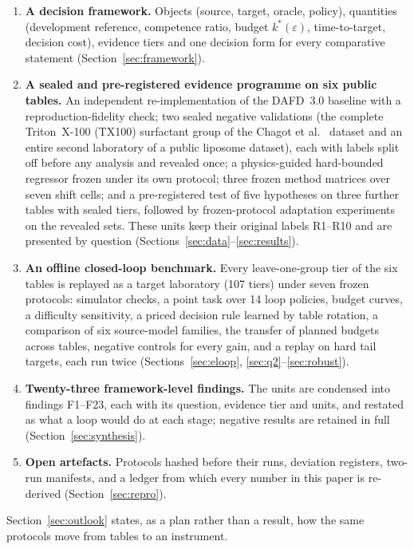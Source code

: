 \documentclass[11pt,a4paper]{article}
\newcommand{\tox}{TX100}
\begin{document}
\begin{enumerate}[leftmargin=*,itemsep=2pt]
\item \textbf{A decision framework.} Objects (source, target, oracle,
  policy), quantities (development reference, competence ratio, budget
  $k^{*}(\varepsilon)$, time-to-target, decision cost), evidence tiers and one
  decision form for every comparative statement (Section~\ref{sec:framework}).
\item \textbf{A sealed and pre-registered evidence programme on six public
  tables.} An independent re-implementation of the DAFD~3.0 baseline with a
  reproduction-fidelity check; two sealed negative validations (the complete
  Triton~X-100 (\tox{}) surfactant group of the Chagot et
  al.~\cite{chagot2022} dataset and an entire second laboratory of a public
  liposome dataset), each with labels split off before any analysis and
  revealed once; a physics-guided hard-bounded regressor frozen under its own
  protocol; three frozen method matrices over seven shift cells; and a
  pre-registered test of five hypotheses on three further tables with sealed
  tiers, followed by frozen-protocol adaptation experiments on the revealed
  sets. These units keep their original labels R1--R10 and are presented by
  question (Sections~\ref{sec:data}--\ref{sec:results}).
\item \textbf{An offline closed-loop benchmark.} Every leave-one-group tier of
  the six tables is replayed as a target laboratory (107 tiers) under seven
  frozen protocols: simulator checks, a point task over 14 loop policies, budget
  curves, a difficulty sensitivity, a priced decision rule learned by table
  rotation, a comparison of six source-model families, the transfer of planned
  budgets across tables, negative controls for every gain, and a replay on hard
  tail targets, each run twice
  (Sections~\ref{sec:eloop}, \ref{sec:q2}--\ref{sec:robust}).
\item \textbf{Twenty-three framework-level findings.} The units are condensed
  into findings F1--F23, each with its question, evidence tier and units, and
  restated as what a loop would do at each stage; negative results are
  retained in full (Section~\ref{sec:synthesis}).
\item \textbf{Open artefacts.} Protocols hashed before their runs, deviation
  registers, two-run manifests, and a ledger from which every number in this
  paper is re-derived (Section~\ref{sec:repro}).
\end{enumerate}

Section~\ref{sec:outlook} states, as a plan rather than a result, how the same
protocols move from tables to an instrument.
\end{document}
